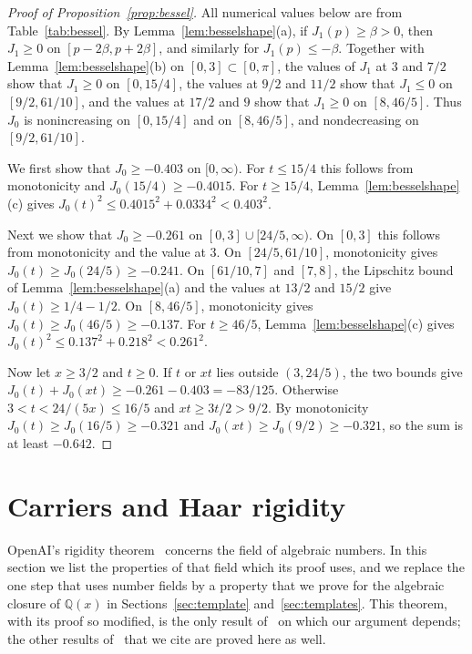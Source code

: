 \documentclass[10pt]{article}
\theoremstyle{remark}
\newcommand{\Q}{\mathbb Q}
\begin{document}
\begin{proof}[Proof of Proposition~\ref{prop:bessel}]
All numerical values below are from Table~\ref{tab:bessel}. By Lemma~\ref{lem:besselshape}(a), if $J_1(p)\ge\beta>0$, then $J_1\ge0$ on $[p-2\beta,p+2\beta]$, and similarly for $J_1(p)\le-\beta$. Together with Lemma~\ref{lem:besselshape}(b) on $[0,3]\subset[0,\pi]$, the values of $J_1$ at $3$ and $7/2$ show that $J_1\ge0$ on $[0,15/4]$, the values at $9/2$ and $11/2$ show that $J_1\le0$ on $[9/2,61/10]$, and the values at $17/2$ and $9$ show that $J_1\ge0$ on $[8,46/5]$. Thus $J_0$ is nonincreasing on $[0,15/4]$ and on $[8,46/5]$, and nondecreasing on $[9/2,61/10]$.

We first show that $J_0\ge-0.403$ on $[0,\infty)$. For $t\le15/4$ this follows from monotonicity and $J_0(15/4)\ge-0.4015$. For $t\ge15/4$, Lemma~\ref{lem:besselshape}(c) gives $J_0(t)^2\le0.4015^2+0.0334^2<0.403^2$.

Next we show that $J_0\ge-0.261$ on $[0,3]\cup[24/5,\infty)$. On $[0,3]$ this follows from monotonicity and the value at $3$. On $[24/5,61/10]$, monotonicity gives $J_0(t)\ge J_0(24/5)\ge-0.241$. On $[61/10,7]$ and $[7,8]$, the Lipschitz bound of Lemma~\ref{lem:besselshape}(a) and the values at $13/2$ and $15/2$ give $J_0(t)\ge1/4-1/2$. On $[8,46/5]$, monotonicity gives $J_0(t)\ge J_0(46/5)\ge-0.137$. For $t\ge46/5$, Lemma~\ref{lem:besselshape}(c) gives $J_0(t)^2\le0.137^2+0.218^2<0.261^2$.

Now let $x\ge3/2$ and $t\ge0$. If $t$ or $xt$ lies outside $(3,24/5)$, the two bounds give $J_0(t)+J_0(xt)\ge-0.261-0.403=-83/125$. Otherwise $3<t<24/(5x)\le16/5$ and $xt\ge3t/2>9/2$. By monotonicity $J_0(t)\ge J_0(16/5)\ge-0.321$ and $J_0(xt)\ge J_0(9/2)\ge-0.321$, so the sum is at least $-0.642$.
\end{proof}

\section{Carriers and Haar rigidity}\label{sec:carriers}

OpenAI's rigidity theorem~\cite[Theorem~2.3]{OAI} concerns the field of algebraic numbers. In this section we list the properties of that field which its proof uses, and we replace the one step that uses number fields by a property that we prove for the algebraic closure of $\Q(x)$ in Sections~\ref{sec:template} and~\ref{sec:templates}. This theorem, with its proof so modified, is the only result of~\cite{OAI} on which our argument depends; the other results of~\cite{OAI} that we cite are proved here as well.
\end{document}
